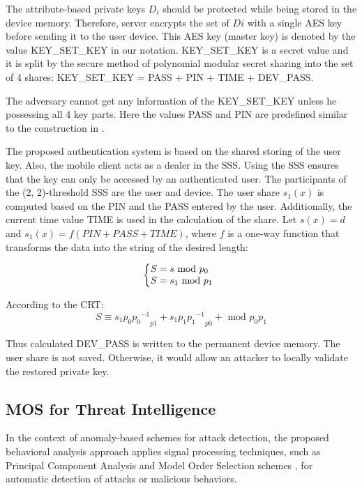 \documentclass[twocolumn]{svjour3}          	%
\begin{document}
The attribute-based private keys $D_i$ should be protected while being stored in the device memory. Therefore, server encrypts the set of $Di$ with a single AES key before sending it to the user device. This AES key (master key) is denoted by the value KEY\_SET\_KEY in our notation. KEY\_SET\_KEY is a secret value and it is split by the secure method of polynomial modular secret sharing \cite{galibus2015mobile, galibus2008some} into the set of 4 shares: KEY\_SET\_KEY = PASS + PIN + TIME + DEV\_PASS. 

The adversary cannot get any information of the KEY\_SET\_KEY unless he possessing all 4 key parts. Here the values PASS and PIN are predefined similar to the construction in \cite{galibus2015mobile}.

The proposed authentication system is based on the shared storing of the user key. Also, the mobile client acts as a dealer in the SSS. Using the SSS ensures that the key can only be accessed by an authenticated user. The participants of the (2, 2)-threshold SSS are the user and device. The user share $s_1(x)$ is computed based on the PIN and the PASS entered by the user. Additionally, the current time value TIME is used in the calculation of the share. Let $s(x) = d$ and $s_1(x) = f(PIN + PASS + TIME)$, where $f$ is a one-way function that transforms the data into the string of the desired length: 

\begin{equation}\label{eq:eq01}
  \left\{
  \begin{array}{@{}ll@{}}
    S = s \textrm{ mod } p_0
    \\
    S = s_1 \textrm{ mod } p_1
  \end{array}\right.
\end{equation}

According to the CRT:
\begin{equation}\label{eq:eq02}
S \equiv {s_{1}p_{0}{p_0}^{-1}}_{p1} + {s_{1}p_{1}{p_1}^{-1}}_{p0} + \textrm{ mod } p_0p_1
\end{equation}

Thus calculated DEV\_PASS is written to the permanent device memory. The user share is not saved. Otherwise, it would allow an attacker to locally validate the restored private key.

\subsection{MOS for Threat Intelligence}
\label{sec_mos}
In the context of anomaly-based schemes for attack detection, the proposed behavioral analysis approach applies signal processing techniques, such as Principal Component Analysis and Model Order Selection schemes \cite{tenorio2013greatest}, for automatic detection of attacks or malicious behaviors. 
\end{document}
